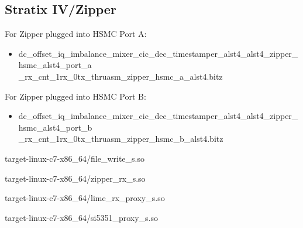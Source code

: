 \subsection{Stratix IV/Zipper}
	For Zipper plugged into HSMC Port A:
	\begin{itemize}
	\item
dc\_offset\_iq\_imbalance\_mixer\_cic\_dec\_timestamper\_alst4\_alst4\_zipper\_hsmc\_alst4\_port\_a \\ \_rx\_cnt\_1rx\_0tx\_thruasm\_zipper\_hsmc\_a\_alst4.bitz
 	\end{itemize}
	\noindent For Zipper plugged into HSMC Port B:
	\begin{itemize}
	\item	dc\_offset\_iq\_imbalance\_mixer\_cic\_dec\_timestamper\_alst4\_alst4\_zipper\_hsmc\_alst4\_port\_b \\ \_rx\_cnt\_1rx\_0tx\_thruasm\_zipper\_hsmc\_b\_alst4.bitz
	\end{itemize}
	\begin{itemize}
	\begin{minipage}[t]{.5\textwidth}
	\item target-linux-c7-x86\_64/file\_write\_s.so
	\item target-linux-c7-x86\_64/zipper\_rx\_s.so
	\end{minipage}
	\begin{minipage}[t]{.5\textwidth}
	\item target-linux-c7-x86\_64/lime\_rx\_proxy\_s.so
	\item target-linux-c7-x86\_64/si5351\_proxy\_s.so
	\end{minipage}
	\end{itemize}
